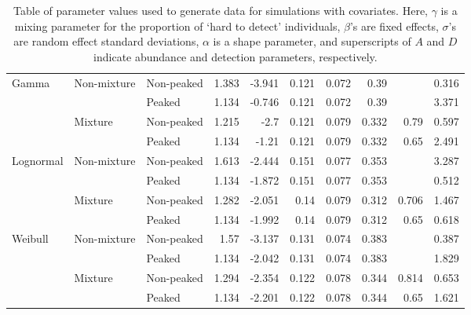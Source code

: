 \documentclass[useAMS,usenatbib,referee,12pt]{article}
\begin{document}
\begin{table}
\begin{tabular}{ll|lrrrrrrr}
Gamma & Non-mixture & Non-peaked &1.383&-3.941&0.121&0.072&0.39& & 0.316 \\
& & Peaked &1.134&-0.746&0.121&0.072&0.39& & 3.371 \\
& Mixture & Non-peaked &1.215&-2.7&0.121&0.079&0.332&0.79& 0.597 \\
& & Peaked &1.134&-1.21&0.121&0.079&0.332&0.65& 2.491 \\
Lognormal & Non-mixture & Non-peaked &1.613&-2.444&0.151&0.077&0.353& & 3.287 \\
& & Peaked &1.134&-1.872&0.151&0.077&0.353& & 0.512 \\
& Mixture & Non-peaked &1.282&-2.051&0.14&0.079&0.312&0.706& 1.467 \\
& & Peaked &1.134&-1.992&0.14&0.079&0.312&0.65& 0.618 \\
Weibull & Non-mixture & Non-peaked &1.57&-3.137&0.131&0.074&0.383& & 0.387 \\
& & Peaked &1.134&-2.042&0.131&0.074&0.383& & 1.829 \\
& Mixture & Non-peaked &1.294&-2.354&0.122&0.078&0.344&0.814& 0.653 \\
& & Peaked &1.134&-2.201&0.122&0.078&0.344&0.65& 1.621 \\
   \hline
\end{tabular}
\caption{\label{tbl:sim3}Table of parameter values used to generate data for simulations with covariates.  Here, $\gamma$ is a mixing parameter for the proportion of `hard to detect' individuals, $\beta$'s are fixed effects, $\sigma$'s are random effect standard deviations, $\alpha$ is a shape parameter, and superscripts of $A$ and $D$ indicate abundance and detection parameters, respectively.}
\end{table}
\end{document}
